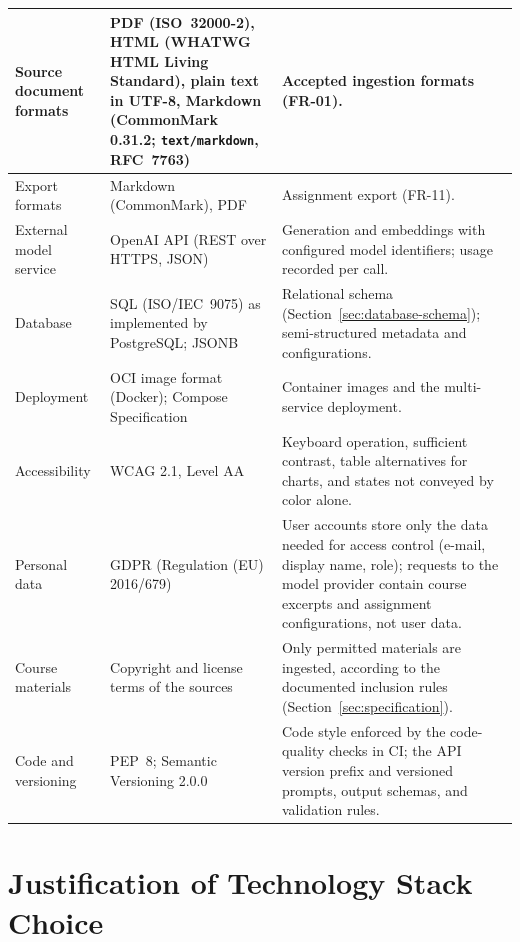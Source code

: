 \documentclass[12pt,a4paper]{article}
\begin{document}
\begin{xltabular}{\textwidth}{
    |p{30mm}|p{55mm}|X|
}
Source document formats &
PDF (ISO~32000-2), HTML (WHATWG HTML Living Standard), plain text in
UTF-8, Markdown (CommonMark 0.31.2; \texttt{text/markdown},
RFC~7763) &
Accepted ingestion formats (FR-01). \\
\hline

Export formats &
Markdown (CommonMark), PDF &
Assignment export (FR-11). \\
\hline

External model service &
OpenAI API (REST over HTTPS, JSON) &
Generation and embeddings with configured model identifiers; usage
recorded per call. \\
\hline

Database &
SQL (ISO/IEC~9075) as implemented by PostgreSQL; JSONB &
Relational schema (Section~\ref{sec:database-schema}); semi-structured
metadata and configurations. \\
\hline

Deployment &
OCI image format (Docker); Compose Specification &
Container images and the multi-service deployment. \\
\hline

Accessibility &
WCAG 2.1, Level AA &
Keyboard operation, sufficient contrast, table alternatives for
charts, and states not conveyed by color alone. \\
\hline

Personal data &
GDPR (Regulation (EU) 2016/679) &
User accounts store only the data needed for access control (e-mail,
display name, role); requests to the model provider contain course
excerpts and assignment configurations, not user data. \\
\hline

Course materials &
Copyright and license terms of the sources &
Only permitted materials are ingested, according to the documented
inclusion rules (Section~\ref{sec:specification}). \\
\hline

Code and versioning &
PEP~8; Semantic Versioning 2.0.0 &
Code style enforced by the code-quality checks in CI; the API version
prefix and versioned prompts, output schemas, and validation
rules. \\
\hline

\end{xltabular}
\endgroup

\clearpage

\section{Justification of Technology Stack Choice}
\label{sec:technology-stack}
\end{document}
